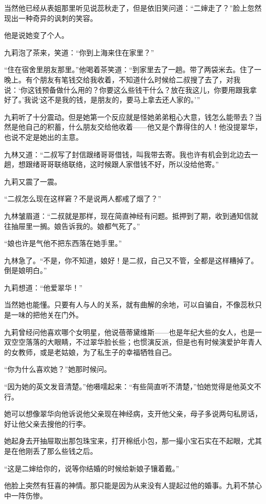 \par 当然他已经从表姐那里听见说蕊秋走了，但是依旧笑问道：“二婶走了？”脸上忽然现出一种奇异的讽刺的笑容。
\par 他是说她变了个人。
\par 九莉泡了茶来，笑道：“你到上海来住在家里？”
\par “住在宿舍里朋友那里。”他喝着茶笑道：“到家里去了一趟。带了两袋米去。住了一晚上。有个朋友有笔钱交给我收着，不知道什么时候给二叔搜了去了，对我说：‘你这钱预备做什么用的？你要这么些钱干什么？放在我这儿，你要用跟我拿好了。’我说‘这不是我的钱，是朋友的，要马上拿去还人家的。'”
\par 九莉听了十分震动。但是她第一个反应就是怪她弟弟粗心大意，钱怎么能带去？当然是他自己的积蓄，什么朋友交给他收着——他又是个靠得住的人！他没提翠华，也说不定是她出的主意。
\par 九林又道：“二叔写了封信跟绪哥哥借钱，叫我带去寄。我也许有机会到北边去一趟，想跟绪哥哥联络联络，这时候跟人家借钱不好，所以没给他寄。”
\par 九莉又震了一震。
\par “二叔怎么现在这样窘？不是说两人都戒了烟了？”
\par 九林皱眉道：“二叔就是那样，现在简直神经有问题。抵押到了期，收到通知信就往抽屉里一搁。娘告诉我的。娘都气死了。”
\par “娘也许是气他不把东西落在她手里。”
\par 九林急了。“不是，你不知道，娘好！是二叔，自己又不管，全都是这样糟掉了。倒是娘明白。”
\par 九莉想道：“他爱翠华！”
\par 当然她也能懂。只要有人与人的关系，就有曲解的余地，可以自骗自，不像蕊秋只是一味的把他关在门外。
\par 九莉曾经问他喜欢哪个女明星，他说蓓蒂黛维斯——也是年纪大些的女人，也是一双空空落落的大眼睛，不过翠华脸长些；也惯演反派，但是也有时候演爱护年青人的女教师，或是老姑娘，为了私生子的幸福牺牲自己。
\par “你为什么喜欢她？”她那时候问。
\par “因为她的英文发音清楚。”他嗫嚅起来：“有些简直听不清楚，”怕她觉得是他英文不行。
\par 她可以想像翠华向他诉说他父亲现在神经病，支开他父亲，母子多说两句私房话，好让他父亲去搜他的行李。
\par 她起身去开抽屉取出那包珠宝来，打开棉纸小包，那一撮小宝石实在不起眼，尤其是在他刚丢了那么些钱之后。
\par “这是二婶给你的，说等你结婚的时候给新娘子镶着戴。”
\par 他脸上突然有狂喜的神情。那只能是因为从来没有人提起过他的婚事。九莉不禁心中一阵伤惨。
